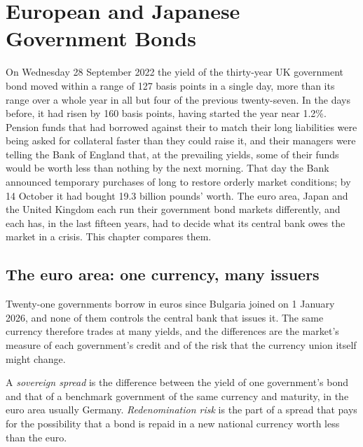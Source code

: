 \chapter{European and Japanese Government Bonds}\label{ch:m2:european-and-japanese-government-bonds}

On Wednesday 28 September 2022 the yield of the thirty-year UK government bond
moved within a range of 127 basis points in a single day, more than its range
over a whole year in all but four of the previous twenty-seven. In the days
before, it had risen by 160 basis points, having started the year near 1.2\%.
Pension funds that had borrowed against their  to match their long
liabilities were being asked for collateral faster than they could raise it,
and their managers were telling the Bank of England that, at the prevailing
yields, some of their funds would be worth less than nothing by the next
morning. That day the Bank announced temporary purchases of long  to
restore orderly market conditions; by 14 October it had bought 19.3 billion
pounds' worth. The euro area, Japan and the United Kingdom each run their
government bond markets differently, and each has, in the last fifteen
years, had to decide what its central bank owes the market in a crisis. This
chapter compares them.

\section{The euro area: one currency, many issuers}

Twenty-one governments borrow in euros since Bulgaria joined on 1 January
2026, and none of them controls the central bank that issues it. The same currency therefore trades at many yields, and the
differences are the market's measure of each government's credit and of the
risk that the currency union itself might change.

\begin{definition}\label{def:m2:european-and-japanese-government-bonds:spread}
A \emph{sovereign spread} is the difference between the
yield of one government's bond and that of a benchmark government of the same
currency and maturity, in the euro area usually Germany. \emph{Redenomination
risk} is the part of a spread that pays for the
possibility that a bond is repaid in a new national currency worth less than
the euro.
\end{definition}

